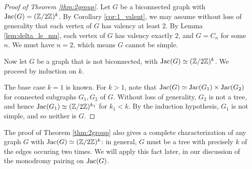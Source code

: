 \documentclass{amsart}
\begin{document}
\begin{proof}[Proof of Theorem \ref{thm:2group}]
  Let $G$ be a biconnected graph with $\operatorname{Jac}(G) = (\mathbb{Z}/2\mathbb{Z})^k$. By
  Corollary \ref{cor:1_valent}, we may assume without loss of
  generality that each vertex of $G$ has valency at least $2$. By
  Lemma \ref{lem:delta_le_mu}, each vertex of $G$ has valency exactly
  $2$, and $G = C_n$ for some $n$. We must have $n=2$, which means $G$
  cannot be simple.

  Now let $G$ be a graph that is not biconnected, with $\operatorname{Jac}(G) \simeq
  (\mathbb{Z}/2\mathbb{Z})^k$. We proceed by induction on $k$.
  
  The base case $k=1$ is known. For $k > 1$, note that $\operatorname{Jac}(G) \simeq
  \operatorname{Jac}(G_1) \times \operatorname{Jac}(G_2)$ for connected subgraphs $G_1, G_2$ of
  $G$. Without loss of generality, $G_2$ is not a tree, and
  hence $\operatorname{Jac}(G_1) \simeq (\mathbb{Z}/2\mathbb{Z})^{k_1}$ for $k_1 < k$. By the
  induction hypothesis, $G_1$ is not simple, and so neither is $G$.
\end{proof}

\begin{remark}
  The proof of Theorem \ref{thm:2group} also gives a complete
  characterization of any graph $G$ with $\operatorname{Jac}(G) \simeq
  (\mathbb{Z}/2\mathbb{Z})^k$: in general, $G$ must be a tree with precisely $k$ of
  the edges occuring two times. We will apply this fact later, in our
  discussion of the monodromy pairing on $\operatorname{Jac}(G)$.
\end{remark}
\end{document}
